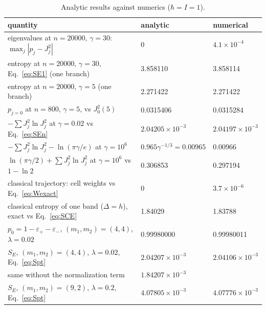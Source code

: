 \documentclass[aps,preprint,12pt,superscriptaddress,nofootinbib]{revtex4-2}
\newcommand{\epsp}{\varepsilon_{+}}
\newcommand{\epsm}{\varepsilon_{-}}
\begin{document}
\begin{table}[h]
\caption{Analytic results against numerics ($\hbar=I=1$).}
\label{tab:checks}
\begin{ruledtabular}
\begin{tabular}{lll}
quantity & analytic & numerical\\
\hline
eigenvalues at $n=20000$, $\gamma=30$: $\max_{j}|p_{j}-J_{j}^{2}|$ & 0 & $4.1\times10^{-4}$\\
entropy at $n=20000$, $\gamma=30$, Eq.~\eqref{eq:SE1} (one branch) & 3.858110 & 3.858114\\
entropy at $n=20000$, $\gamma=5$ (one branch) & 2.271422 & 2.271422\\
$p_{j=0}$ at $n=800$, $\gamma=5$, vs $J_{0}^{2}(5)$ & 0.0315406 & 0.0315284\\
$-\sum J_{j}^{2}\ln J_{j}^{2}$ at $\gamma=0.02$ vs Eq.~\eqref{eq:SEn} & $2.04205\times10^{-3}$ & $2.04197\times10^{-3}$\\
$-\sum J_{j}^{2}\ln J_{j}^{2}-\ln(\pi\gamma/e)$ at $\gamma=10^{6}$ & $0.965\gamma^{-1/3}=0.00965$ & 0.00966\\
$\ln(\pi\gamma/2)+\sum J_{j}^{2}\ln J_{j}^{2}$ at $\gamma=10^{6}$ vs $1-\ln2$ & 0.306853 & 0.297194\\
classical trajectory: cell weights vs Eq.~\eqref{eq:Wexact} & 0 & $3.7\times10^{-6}$\\
classical entropy of one band ($\Delta=h$), exact vs Eq.~\eqref{eq:SCE} & 1.84029 & 1.83788\\
$p_{0}=1-\epsp-\epsm$, $(m_{1},m_{2})=(4,4)$, $\lambda=0.02$ & 0.99980000 & 0.99980011\\
$S_{E}$, $(m_{1},m_{2})=(4,4)$, $\lambda=0.02$, Eq.~\eqref{eq:Spt} & $2.04207\times10^{-3}$ & $2.04106\times10^{-3}$\\
same without the normalization term & $1.84207\times10^{-3}$ & \\
$S_{E}$, $(m_{1},m_{2})=(9,2)$, $\lambda=0.2$, Eq.~\eqref{eq:Spt} & $4.07805\times10^{-3}$ & $4.07776\times10^{-3}$\\
\end{tabular}
\end{ruledtabular}
\end{table}
\end{document}
